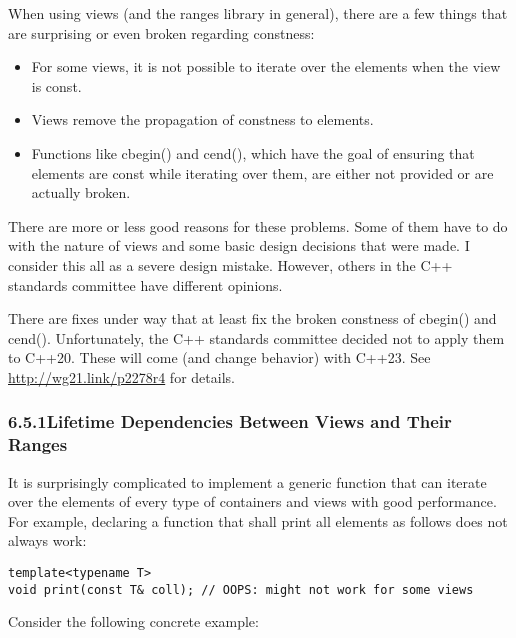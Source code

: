 
When using views (and the ranges library in general), there are a few things that are surprising or even broken regarding constness:

\begin{itemize}
\item
For some views, it is not possible to iterate over the elements when the view is const.

\item
Views remove the propagation of constness to elements.

\item
Functions like cbegin() and cend(), which have the goal of ensuring that elements are const while iterating over them, are either not provided or are actually broken.
\end{itemize}

There are more or less good reasons for these problems. Some of them have to do with the nature of views and some basic design decisions that were made. I consider this all as a severe design mistake. However, others in the C++ standards committee have different opinions.

There are fixes under way that at least fix the broken constness of cbegin() and cend(). Unfortunately, the C++ standards committee decided not to apply them to C++20. These will come (and change behavior) with C++23. See \url{http://wg21.link/p2278r4} for details.

\subsubsection*{ 6.5.1\hspace{0.2cm}Lifetime Dependencies Between Views and Their Ranges}

It is surprisingly complicated to implement a generic function that can iterate over the elements of every type of containers and views with good performance. For example, declaring a function that shall print all elements as follows does not always work:

\begin{lstlisting}[style=styleCXX]
template<typename T>
void print(const T& coll); // OOPS: might not work for some views
\end{lstlisting}

Consider the following concrete example:

